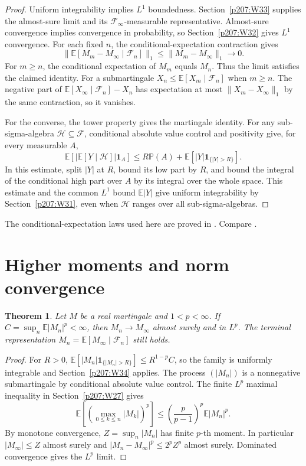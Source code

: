 \documentclass[11pt,oneside,openany]{book}
\theoremstyle{plain}
\newtheorem{theorem}{Theorem}[chapter]
\theoremstyle{definition}
\theoremstyle{remark}
\begin{document}
\begin{proof}
Uniform integrability implies \(L^1\) boundedness.
Section~\ref{p207:W33} supplies the almost-sure limit and its
\(\mathcal F_\infty\)-measurable representative. Almost-sure convergence
implies convergence in probability, so Section~\ref{p207:W32} gives
\(L^1\) convergence. For each fixed \(n\), the conditional-expectation
contraction gives
\[
 \big\lVert\mathbb E[M_m-M_\infty\mid\mathcal F_n]\big\rVert_1
 \le \lVert M_m-M_\infty\rVert_1\longrightarrow0.
\]
For \(m\ge n\), the conditional expectation of \(M_m\) equals \(M_n\).
Thus the limit satisfies the claimed identity. For a submartingale
\(X_n\le \mathbb E[X_m\mid\mathcal F_n]\) when \(m\ge n\).
The negative part of
\(\mathbb E[X_\infty\mid\mathcal F_n]-X_n\) has expectation at most
\(\lVert X_m-X_\infty\rVert_1\) by the same contraction, so it vanishes.

For the converse, the tower property gives the martingale identity.
For any sub-sigma-algebra \(\mathcal H\subseteq\mathcal F\), conditional
absolute value control and positivity give, for every measurable \(A\),
\[
 \mathbb E[|\mathbb E[Y\mid\mathcal H]|\mathbf 1_A]
 \le R\mathbb P(A)
    +\mathbb E[|Y|\mathbf 1_{\{|Y|>R\}}].
\]
In this estimate, split \(|Y|\) at \(R\), bound its low part by \(R\),
and bound the integral of the conditional high part over \(A\) by
its integral over the whole space. This estimate and the common
\(L^1\) bound \(\mathbb E|Y|\) give uniform integrability by
Section~\ref{p207:W31}, even when \(\mathcal H\) ranges over all
sub-sigma-algebras.
\end{proof}

\noindent
The conditional-expectation laws used here are proved in \cite{P105}.
Compare \cite[Theorem 9.22]{Kallenberg}.

\section{Higher moments and norm convergence}
\label{p207:W35}

\begin{theorem}
Let \(M\) be a real martingale and \(1<p<\infty\).
If \(C=\sup_n\mathbb E|M_n|^p<\infty\), then \(M_n\to M_\infty\)
almost surely and in \(L^p\). The terminal representation
\(M_n=\mathbb E[M_\infty\mid\mathcal F_n]\) still holds.
\end{theorem}

\begin{proof}
For \(R>0\),
\(\mathbb E[|M_n|\mathbf 1_{\{|M_n|>R\}}]\le R^{1-p}C\),
so the family is uniformly integrable and
Section~\ref{p207:W34} applies. The process \((|M_n|)\) is a
nonnegative submartingale by conditional absolute value control.
The finite \(L^p\) maximal inequality in Section~\ref{p207:W27}
gives
\[
 \mathbb E\left[\left(\max_{0\le k\le n}|M_k|\right)^p\right]
 \le \left(\frac{p}{p-1}\right)^p \mathbb E|M_n|^p.
\]
By monotone convergence, \(Z=\sup_n|M_n|\) has finite \(p\)-th
moment. In particular \(|M_\infty|\le Z\) almost surely and
\(|M_n-M_\infty|^p\le 2^p Z^p\) almost surely. Dominated
convergence gives the \(L^p\) limit.
\end{proof}
\end{document}
